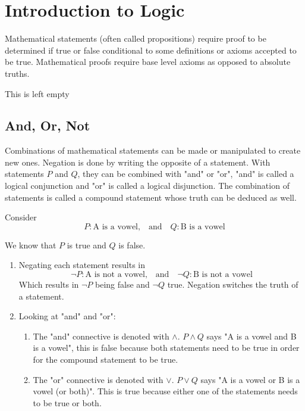 \section{Introduction to Logic}

Mathematical statements (often called propositions) require proof to be determined if true or false conditional to some definitions or axioms accepted to be true.
Mathematical proofs require base level axioms as opposed to absolute truths.

\begin{remark}
    This is left empty
\end{remark}

\subsection{And, Or, Not}

Combinations of mathematical statements can be made or manipulated to create new ones.
Negation is done by writing the opposite of a statement.
With statements $P$ and $Q$, they can be combined with "and" or "or", "and" is called a logical conjunction and "or" is called a logical disjunction.
The combination of statements is called a compound statement whose truth can be deduced as well.

\begin{example}
    Consider
    $$
    P: \text{A is a vowel,} \quad \text{and} \quad Q: \text{B is a vowel}
    $$

    We know that $P$ is true and $Q$ is false.

    \begin{enumerate}
        \item Negating each statement results in
            $$
            \neg P: \text{A is not a vowel,} \quad \text{and} \quad \neg Q: \text{B is not a vowel}
            $$
            Which results in $\neg P$ being false and $\neg Q$ true. Negation switches the truth of a statement.
        \item Looking at "and" and "or":
            \begin{enumerate}[label=(\alph*)]
                \item The "and" connective is denoted with $\land$. $P \land Q$ says "A is a vowel and B is a vowel", this is false because both statements need to be true in order for the compound statement to be true.
                \item The "or" connective is denoted with $\lor$. $P \lor Q$ says "A is a vowel or B is a vowel (or both)". This is true because either one of the statements needs to be true or both.
            \end{enumerate}
    \end{enumerate}
\end{example}


